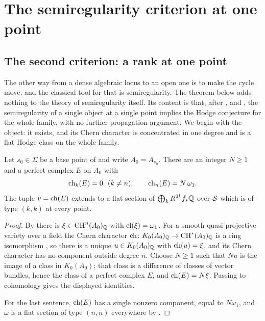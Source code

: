 \section{The semiregularity criterion at one point}\label{sec:rankpoint}

\subsection{The second criterion: a rank at one point}

The other way from a dense algebraic locus to an open one is to make the
cycle move, and the classical tool for that is semiregularity. The theorem
below adds nothing to the theory of semiregularity itself. Its content is
that, after \cite[Theorem~4.14]{paperI}, \cite[Theorem~15.27]{paperI} and
\cite[Theorem~16.4]{paperI}, the semiregularity of a single object at a single
point implies the Hodge conjecture for the whole family, with no further
propagation argument. We begin with the object: it exists, and its Chern
character is concentrated in one degree and is a flat Hodge class on the
whole family.

\begin{proposition}\label{prop:ktheory}
Let $s_{0}\in\Sigma$ be a base point of \cite[Theorem~15.27]{paperI} and write
$A_{0}=A_{s_{0}}$. There are an integer $N\ge1$ and a perfect complex $E$ on
$A_{0}$ with
\[
  \operatorname{ch}_{k}(E)=0\ \ (k\ne n),\qquad \operatorname{ch}_{n}(E)=N\,\omega_{1} .
\]
The tuple $v=\operatorname{ch}(E)$ extends to a flat section of
$\bigoplus_{k}R^{2k}f_{*}\mathbb{Q}$ over $\mathcal{S}$ which is of type $(k,k)$ at every
point.
\end{proposition}

\begin{proof}
By \cite[Theorem~15.27]{paperI} there is $\xi\in\operatorname{CH}^{n}(A_{0})_{\mathbb{Q}}$ with
$\mathrm{cl}(\xi)=\omega_{1}$. For a smooth quasi-projective variety over a field the
Chern character $\operatorname{ch}\colon K_{0}(A_{0})_{\mathbb{Q}}\to\operatorname{CH}^{*}(A_{0})_{\mathbb{Q}}$ is a
ring isomorphism \cite[Ex.~15.2.16(b) and Cor.~18.3.2]{Ful98}, so there is a
unique $u\in K_{0}(A_{0})_{\mathbb{Q}}$ with $\operatorname{ch}(u)=\xi$, and its Chern character
has no component outside degree $n$. Choose $N\ge1$ such that $Nu$ is the
image of a class in $K_{0}(A_{0})$; that class is a difference of classes of
vector bundles, hence the class of a perfect complex $E$, and
$\operatorname{ch}(E)=N\xi$. Passing to cohomology gives the displayed identities.

For the last sentence, $\operatorname{ch}(E)$ has a single nonzero component, equal to
$N\omega_{1}$, and $\omega$ is a flat section of type $(n,n)$ everywhere by
\cite[Lemma~16.2]{paperI}.
\end{proof}

